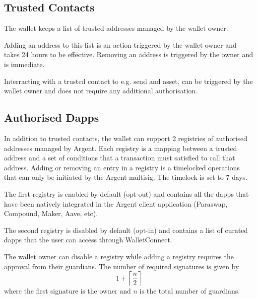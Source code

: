 \documentclass[12pt]{article}
\begin{document}
\subsection{Trusted Contacts}
\label{sec:trusted-contacts}

The wallet keeps a list of trusted addresses managed by the wallet owner.

Adding an address to this list is an action triggered by the wallet owner and takes 24 hours to be effective. Removing an address is triggered by the owner and is immediate.

Interracting with a trusted contact to e.g. send and asset, can be triggered by the wallet owner and does not require any additional authorisation. 

\subsection{Authorised Dapps}
\label{sec:authorised-dapps}

In addition to trusted contacts, the wallet can support 2 registries of authorised addresses managed by Argent.
Each registry is a mapping between a trusted address and a set of conditions that a transaction must satisfied to call that address.
Adding or removing an entry in a registry is a timelocked operations that can only be initiated by the Argent multisig. The timelock is set to 7 days.

The first registry is enabled by default (opt-out) and contains all the dapps that have been natively integrated in the Argent client application (Paraswap, Compound, Maker, Aave, etc).

The second registry is disabled by default (opt-in) and contains a list of curated dapps that the user can access through WalletConnect.

The wallet owner can disable a registry while adding a registry requires the approval from their guardians. The number of required signatures is given by
\begin{equation*}
    1+\left\lceil {\frac{n}{2}} \right\rceil
\end{equation*}
where the first signature is the owner and $n$ is the total number of guardians.


\end{document}
